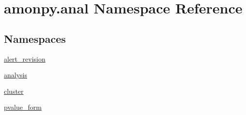 \hypertarget{namespaceamonpy_1_1anal}{\section{amonpy.\-anal Namespace Reference}
\label{namespaceamonpy_1_1anal}
}
\subsection*{Namespaces}
\begin{DoxyCompactItemize}
\item 
\hyperlink{namespaceamonpy_1_1anal_1_1alert__revision}{alert\-\_\-revision}
\item 
\hyperlink{namespaceamonpy_1_1anal_1_1analysis}{analysis}
\item 
\hyperlink{namespaceamonpy_1_1anal_1_1cluster}{cluster}
\item 
\hyperlink{namespaceamonpy_1_1anal_1_1pvalue__form}{pvalue\-\_\-form}
\end{DoxyCompactItemize}
